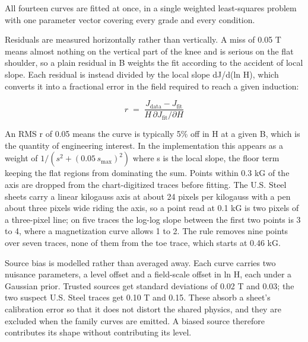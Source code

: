 \documentclass[
  11pt,
]{article}
\newcounter{none} %
\begin{document}
All fourteen curves are fitted at once, in a single weighted least-squares problem with one parameter vector covering every grade and every condition.

Residuals are measured horizontally rather than vertically. A miss of 0.05 T means almost nothing on the vertical part of the knee and is serious on the flat shoulder, so a plain residual in B weights the fit according to the accident of local slope. Each residual is instead divided by the local slope dJ/d(ln H), which converts it into a fractional error in the field required to reach a given induction:

\begin{equation}\label{eq:resid}
r \;=\; \frac{J_{\text{data}} - J_{\text{fit}}}{H \,\partial J_{\text{fit}}/\partial H}
\end{equation}

An RMS r of 0.05 means the curve is typically 5\% off in H at a given B, which is the quantity of engineering interest. In the implementation this appears as a weight of \(1/(s^{2} + (0.05\,s_{\mathrm{max}})^{2})\) where s is the local slope, the floor term keeping the flat regions from dominating the sum. Points within 0.3 kG of the axis are dropped from the chart-digitized traces before fitting. The U.S. Steel sheets carry a linear kilogauss axis at about 24 pixels per kilogauss with a pen about three pixels wide riding the axis, so a point read at 0.1 kG is two pixels of a three-pixel line; on five traces the log-log slope between the first two points is 3 to 4, where a magnetization curve allows 1 to 2. The rule removes nine points over seven traces, none of them from the toe trace, which starts at 0.46 kG.

Source bias is modelled rather than averaged away. Each curve carries two nuisance parameters, a level offset and a field-scale offset in ln H, each under a Gaussian prior. Trusted sources get standard deviations of 0.02 T and 0.03; the two suspect U.S. Steel traces get 0.10 T and 0.15. These absorb a sheet's calibration error so that it does not distort the shared physics, and they are excluded when the family curves are emitted. A biased source therefore contributes its shape without contributing its level.
\end{document}
